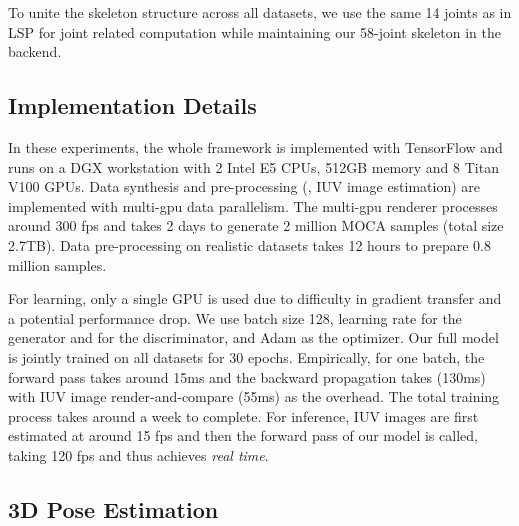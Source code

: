 \documentclass[10pt,twocolumn,letterpaper]{article}
\newcommand{\beforesubsection}{\vspace{0mm}}
\newcommand{\aftersubsection}{\vspace{0mm}}
\begin{document}
To unite the skeleton structure across all datasets, we use the same 14 joints as in LSP for joint related computation while maintaining our 58-joint skeleton in the backend. 

\beforesubsection
\subsection{Implementation Details}
\aftersubsection

In these experiments, the whole framework is implemented with TensorFlow and runs on a DGX workstation with 2 Intel E5 CPUs, 512GB memory and 8 Titan V100 GPUs.
Data synthesis and pre-processing (\ie, IUV image estimation) are implemented with multi-gpu data parallelism. The multi-gpu renderer processes around 300 fps and takes 2 days to generate 2 million MOCA samples (total size 2.7TB). Data pre-processing on realistic datasets takes 12 hours to prepare 0.8 million samples.

For learning, only a single GPU is used due to difficulty in gradient transfer and a potential performance drop. We use batch size 128, learning rate  for the generator and  for the discriminator, and Adam as the optimizer. Our full model is jointly trained on all datasets for 30 epochs. Empirically, for one batch, the forward pass takes around 15ms and the backward propagation takes (130ms) with IUV image render-and-compare (55ms) as the overhead. The total training process takes around a week to complete. For inference, IUV images are first estimated at around 15 fps and then the forward pass of our model is called, taking 120 fps and thus achieves \textit{real time}.

\beforesubsection
\subsection{3D Pose Estimation}
\aftersubsection
\end{document}
